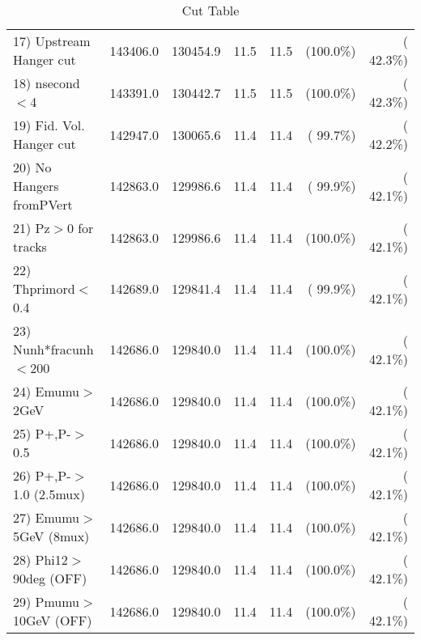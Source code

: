 \begin{table}[h!]
\begin{tabular}{||l||r|r|r|r|r|r||}
 17) Upstream Hanger cut  &     143406.0 &     130454.9 &         11.5 &         11.5 & (100.0\%) & ( 42.3\%) \\
 18) nsecond$<$4          &     143391.0 &     130442.7 &         11.5 &         11.5 & (100.0\%) & ( 42.3\%) \\
 19) Fid. Vol. Hanger cut &     142947.0 &     130065.6 &         11.4 &         11.4 & ( 99.7\%) & ( 42.2\%) \\
 20) No Hangers fromPVert &     142863.0 &     129986.6 &         11.4 &         11.4 & ( 99.9\%) & ( 42.1\%) \\
 21) Pz$>$0 for tracks    &     142863.0 &     129986.6 &         11.4 &         11.4 & (100.0\%) & ( 42.1\%) \\
 22) Thprimord$<$0.4      &     142689.0 &     129841.4 &         11.4 &         11.4 & ( 99.9\%) & ( 42.1\%) \\
 23) Nunh*fracunh$<$200   &     142686.0 &     129840.0 &         11.4 &         11.4 & (100.0\%) & ( 42.1\%) \\
 24) Emumu$>$2GeV         &     142686.0 &     129840.0 &         11.4 &         11.4 & (100.0\%) & ( 42.1\%) \\
 25) P+,P-$>$0.5          &     142686.0 &     129840.0 &         11.4 &         11.4 & (100.0\%) & ( 42.1\%) \\
 26) P+,P-$>$1.0 (2.5mux) &     142686.0 &     129840.0 &         11.4 &         11.4 & (100.0\%) & ( 42.1\%) \\
 27) Emumu$>$5GeV  (8mux) &     142686.0 &     129840.0 &         11.4 &         11.4 & (100.0\%) & ( 42.1\%) \\
 28) Phi12$>$90deg  (OFF) &     142686.0 &     129840.0 &         11.4 &         11.4 & (100.0\%) & ( 42.1\%) \\
 29) Pmumu$>$10GeV  (OFF) &     142686.0 &     129840.0 &         11.4 &         11.4 & (100.0\%) & ( 42.1\%) \\
 \hline
 \hline
 \end{tabular}
 \caption{Cut Table           }
 \label{tab-cutcohjpsi-mumu_jpsi}
 \end{table}
